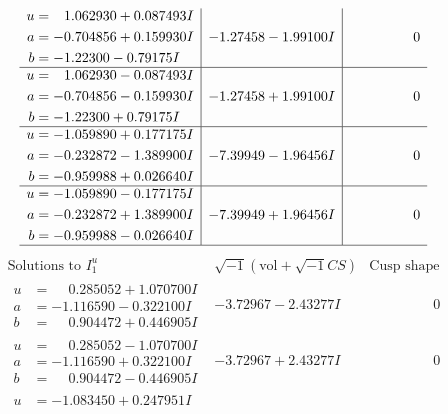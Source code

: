 \documentclass[1p]{elsarticle_modified}
\theoremstyle{definition}
\newcommand{\I}{\sqrt{-1}}
\begin{document}
$$\begin{array}{c|c|c}
\begin{aligned}
u &= \phantom{-}1.062930 + 0.087493 I \\
a &= -0.704856 + 0.159930 I \\
b &= -1.22300 - 0.79175 I\end{aligned}
 & -1.27458 - 1.99100 I & \phantom{-0.000000 } 0 \\ \hline\begin{aligned}
u &= \phantom{-}1.062930 - 0.087493 I \\
a &= -0.704856 - 0.159930 I \\
b &= -1.22300 + 0.79175 I\end{aligned}
 & -1.27458 + 1.99100 I & \phantom{-0.000000 } 0 \\ \hline\begin{aligned}
u &= -1.059890 + 0.177175 I \\
a &= -0.232872 - 1.389900 I \\
b &= -0.959988 + 0.026640 I\end{aligned}
 & -7.39949 - 1.96456 I & \phantom{-0.000000 } 0 \\ \hline\begin{aligned}
u &= -1.059890 - 0.177175 I \\
a &= -0.232872 + 1.389900 I \\
b &= -0.959988 - 0.026640 I\end{aligned}
 & -7.39949 + 1.96456 I & \phantom{-0.000000 } 0\\
 \hline 
 \end{array}$$\newpage$$\begin{array}{c|c|c}  
\text{Solutions to }I^u_{1}& \I (\text{vol} + \sqrt{-1}CS) & \text{Cusp shape}\\
 \hline 
\begin{aligned}
u &= \phantom{-}0.285052 + 1.070700 I \\
a &= -1.116590 - 0.322100 I \\
b &= \phantom{-}0.904472 + 0.446905 I\end{aligned}
 & -3.72967 - 2.43277 I & \phantom{-0.000000 } 0 \\ \hline\begin{aligned}
u &= \phantom{-}0.285052 - 1.070700 I \\
a &= -1.116590 + 0.322100 I \\
b &= \phantom{-}0.904472 - 0.446905 I\end{aligned}
 & -3.72967 + 2.43277 I & \phantom{-0.000000 } 0 \\ \hline\begin{aligned}
u &= -1.083450 + 0.247951 I \\

\end{aligned}
\end{array}$$
\end{document}
